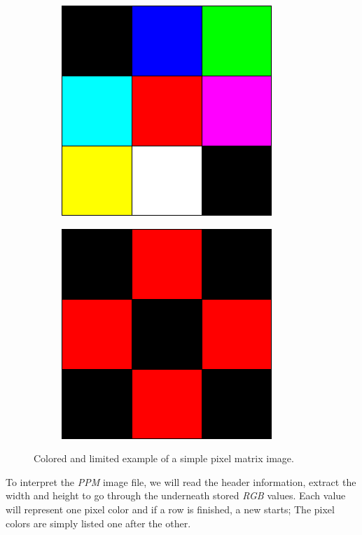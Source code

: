 \begin{figure}[htbp]
	\centering
	\begin{subfigure}{.5\textwidth}
			\centerline{\includegraphics[width=0.75\linewidth]{images/ppm.png}}
			\label{fig:pixelPPMColors}
	\end{subfigure}%
	\begin{subfigure}{.5\textwidth}
		\centerline{\includegraphics[width=0.75\linewidth]{images/ppm-2.png}}
		\label{fig:pixelPPMSimplified}
	\end{subfigure}
	\caption{Colored and limited example of a simple pixel matrix image.}
	\label{fig:pixelPPM}
\end{figure}

\noindent To interpret the \textit{PPM} image file, we will read the header information, extract the width and height to go through the underneath stored \textit{RGB} values. Each value will represent one pixel color and if a row is finished, a new starts; The pixel colors are simply listed one after the other. 


